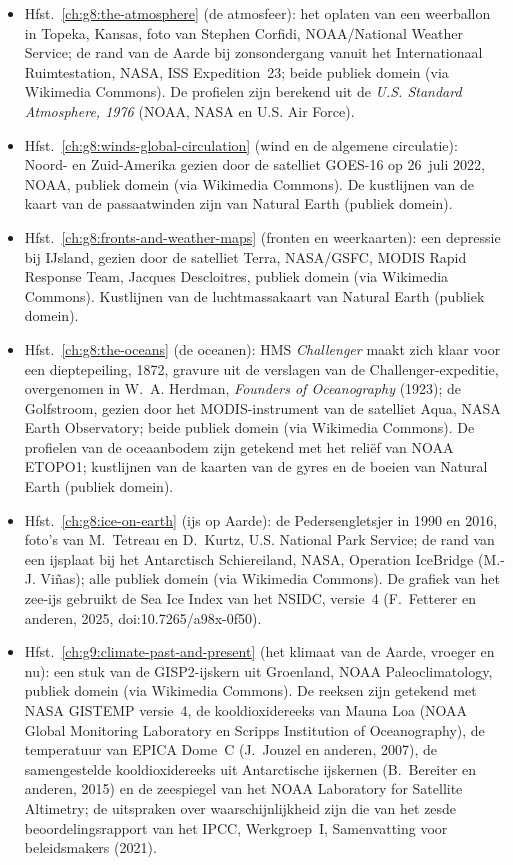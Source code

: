 \begin{itemize}
  \item Hfst.~\ref{ch:g8:the-atmosphere} (de atmosfeer): het oplaten van een weerballon in Topeka, Kansas, foto van Stephen Corfidi, NOAA/National Weather Service; de rand van de Aarde bij zonsondergang vanuit het Internationaal Ruimtestation, NASA, ISS Expedition~23; beide publiek domein (via Wikimedia Commons). De profielen zijn berekend uit de \emph{U.S. Standard Atmosphere, 1976} (NOAA, NASA en U.S. Air Force).
  \item Hfst.~\ref{ch:g8:winds-global-circulation} (wind en de algemene circulatie): Noord- en Zuid-Amerika gezien door de satelliet GOES-16 op 26~juli 2022, NOAA, publiek domein (via Wikimedia Commons). De kustlijnen van de kaart van de passaatwinden zijn van Natural Earth (publiek domein).
  \item Hfst.~\ref{ch:g8:fronts-and-weather-maps} (fronten en weerkaarten): een depressie bij IJsland, gezien door de satelliet Terra, NASA/GSFC, MODIS Rapid Response Team, Jacques Descloitres, publiek domein (via Wikimedia Commons). Kustlijnen van de luchtmassakaart van Natural Earth (publiek domein).
  \item Hfst.~\ref{ch:g8:the-oceans} (de oceanen): HMS \emph{Challenger} maakt zich klaar voor een dieptepeiling, 1872, gravure uit de verslagen van de Challenger-expeditie, overgenomen in W.~A. Herdman, \emph{Founders of Oceanography} (1923); de Golfstroom, gezien door het MODIS-instrument van de satelliet Aqua, NASA Earth Observatory; beide publiek domein (via Wikimedia Commons). De profielen van de oceaanbodem zijn getekend met het reliëf van NOAA ETOPO1; kustlijnen van de kaarten van de gyres en de boeien van Natural Earth (publiek domein).
  \item Hfst.~\ref{ch:g8:ice-on-earth} (ijs op Aarde): de Pedersengletsjer in 1990 en 2016, foto's van M.~Tetreau en D.~Kurtz, U.S. National Park Service; de rand van een ijsplaat bij het Antarctisch Schiereiland, NASA, Operation IceBridge (M.-J. Viñas); alle publiek domein (via Wikimedia Commons). De grafiek van het zee-ijs gebruikt de Sea Ice Index van het NSIDC, versie~4 (F.~Fetterer en anderen, 2025, doi:10.7265/a98x-0f50).
  \item Hfst.~\ref{ch:g9:climate-past-and-present} (het klimaat van de Aarde, vroeger en nu): een stuk van de GISP2-ijskern uit Groenland, NOAA Paleoclimatology, publiek domein (via Wikimedia Commons). De reeksen zijn getekend met NASA GISTEMP versie~4, de kooldioxidereeks van Mauna Loa (NOAA Global Monitoring Laboratory en Scripps Institution of Oceanography), de temperatuur van EPICA Dome~C (J.~Jouzel en anderen, 2007), de samengestelde kooldioxidereeks uit Antarctische ijskernen (B.~Bereiter en anderen, 2015) en de zeespiegel van het NOAA Laboratory for Satellite Altimetry; de uitspraken over waarschijnlijkheid zijn die van het zesde beoordelingsrapport van het IPCC, Werkgroep~I, Samenvatting voor beleidsmakers (2021).

\end{itemize}
